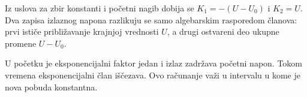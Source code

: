 Iz uslova za zbir konstanti i početni nagib dobija se $K_1=-(U-U_0)$ i $K_2=U$. Dva zapisa izlaznog napona razlikuju se samo algebarskim rasporedom članova: prvi ističe približavanje krajnjoj vrednosti $U$, a drugi ostvareni deo ukupne promene $U-U_0$.

U početku je eksponencijalni faktor jedan i izlaz zadržava početni napon. Tokom vremena eksponencijalni član iščezava. Ovo računanje važi u intervalu u kome je nova pobuda konstantna.
